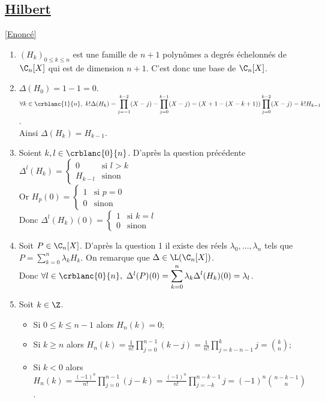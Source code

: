 \documentclass{book}
\begin{document}
	\subsection{\underline{Hilbert} }
	\label{sec:Hilbert}
	\textcolor{blue}{\hyperref[Hilbert]{[Enoncé]}}\\
	\begin{enumerate}[leftmargin=*]
		\item $(H_k)_{0\leq k\leq n}$ est une famille de $n+1$ polynômes a degrés échelonnés de $\C_n[X]$ qui est de dimension $n+1$. C'est donc une base de $\C_n[X]$.
		\item $\Delta(H_0)=1-1=0$.\\
		$\forall k\in \crblanc{1}{n},\ k!\Delta(H_k)=\displaystyle\prod_{j=-1}^{k-2}(X-j)-\prod_{j=0}^{k-1}(X-j)=(X+1-(X-k+1))\prod_{j=0}^{k-2}(X-j)=k!H_{k-1}$.\\
		Ainsi $\Delta(H_k)=H_{k-1}$.
		\item Soient $k,l\in \crblanc{0}{n}$. D'après la question précédente $\Delta^l(H_k)=\begin{cases}
			0&\mbox{si }l>k\\
			H_{k-l}&\mbox{sinon}
		\end{cases}$\\
		Or $H_p(0)=\begin{cases}
			1&\mbox{si }p=0\\
			0&\mbox{sinon}
		\end{cases}$\\
		Donc $\Delta^l(H_k)(0)=\begin{cases}
			1&\mbox{si }k=l\\
			0&\mbox{sinon}
		\end{cases}$
		\item Soit $P\in \C_n[X]$. D'après la question 1 il existe des réels $\lambda_0,\dots,\lambda_n$ tels que $P=\displaystyle\sum_{k=0}^n\lambda_kH_k$. On remarque que $\Delta\in \L(\C_n[X])$.\\
		Donc $\forall l\in \crblanc{0}{n},\ \Delta^l(P)(0)=\displaystyle\sum_{k=0}^n\lambda_k\Delta^l(H_k)(0)=\lambda_l$.
		\item Soit $k\in \Z$.
		\begin{itemize}
			\item Si $0\leq k\leq n-1$ alors $H_n(k)=0$;
			\item Si $k\geq n$ alors $H_n(k)=\displaystyle\frac{1}{n!}\prod_{j=0}^{n-1}(k-j)=\frac{1}{n!}\prod_{j=k-n-1}^kj=\binom{k}{n}$;
			\item Si $k<0$ alors $H_n(k)=\displaystyle\frac{(-1)^n}{n!}\prod_{j=0}^{n-1}(j-k)=\frac{(-1)^n}{n!}\prod_{j=-k}^{n-k-1}j=(-1)^n\binom{n-k-1}{n}$.

\end{itemize}
\end{enumerate}
\end{document}
